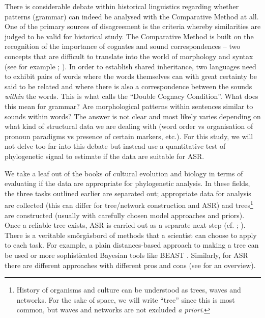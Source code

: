 \documentclass[12pt,letterpaper]{article}
\begin{document}
There is considerable debate within historical linguistics regarding whether patterns (grammar) can indeed be analysed with the Comparative Method at all. One of the primary sources of disagreement is the criteria whereby similarities are judged to be valid for historical study. The Comparative Method is built on the recognition of the importance of cognates and sound correspondences -- two concepts that are difficult to translate into the world of morphology and syntax (see for example \citealt{harris2008reconstruction}; \citealt{walkden_2013}). In order to establish shared inheritance, two languages need to exhibit pairs of words where the words themselves can with great certainty be said to be related and where there is also a correspondence between the sounds \textit{within} the words. This is what \citet{walkden_2013} calls the ``Double Cognacy Condition''. What does this mean for grammar? Are morphological patterns within sentences similar to sounds within words? The answer is not clear and most likely varies depending on what kind of structural data we are dealing with (word order vs organisation of pronoun paradigms vs presence of certain markers, etc.). For this study, we will not delve too far into this debate but instead use a quantitative test of phylogenetic signal to estimate if the data are suitable for ASR.


We take a leaf out of the books of cultural evolution and biology in terms of evaluating if the data are appropriate for phylogenetic analysis. In these fields, the three tasks outlined earlier are separated out; appropriate data for analysis are collected (this can differ for tree/network construction and ASR) and trees\footnote{History of organisms and culture can be understood as trees, waves and networks. For the sake of space, we will write ``tree'' since this is most common, but waves and networks are not excluded \textit{a priori}.} are constructed (usually with carefully chosen model approaches and priors). Once a reliable tree exists, ASR is carried out as a separate next step (cf. \citealt{holland2020accuracy}; \citealt{evans2021uses}). There is a veritable smörgåsbord of methods that a scientist can choose to apply to each task. For example,  a plain distances-based approach to making a tree can be used \citep{jager2016inferring} or more sophisticated Bayesian tools like BEAST \citep{drummond2015bayesian}. Similarly, for ASR there are different approaches with different pros and cons (see \citealt{joy2016ancestral} for an overview). 
\end{document}
